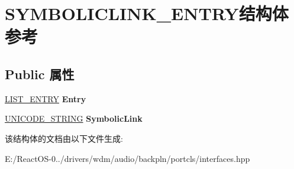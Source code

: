 \hypertarget{struct_s_y_m_b_o_l_i_c_l_i_n_k___e_n_t_r_y}{}\section{S\+Y\+M\+B\+O\+L\+I\+C\+L\+I\+N\+K\+\_\+\+E\+N\+T\+R\+Y结构体 参考}
\label{struct_s_y_m_b_o_l_i_c_l_i_n_k___e_n_t_r_y}
\subsection*{Public 属性}
\begin{DoxyCompactItemize}
\item 
\mbox{\label{struct_s_y_m_b_o_l_i_c_l_i_n_k___e_n_t_r_y_a5a3fbced77b88f52120327fc786aaf0e}} 
\hyperlink{struct___l_i_s_t___e_n_t_r_y}{L\+I\+S\+T\+\_\+\+E\+N\+T\+RY} {\bfseries Entry}
\item 
\mbox{\label{struct_s_y_m_b_o_l_i_c_l_i_n_k___e_n_t_r_y_aef2cd69bee0c6a06906dde2d2ef1979b}} 
\hyperlink{struct___u_n_i_c_o_d_e___s_t_r_i_n_g}{U\+N\+I\+C\+O\+D\+E\+\_\+\+S\+T\+R\+I\+NG} {\bfseries Symbolic\+Link}
\end{DoxyCompactItemize}


该结构体的文档由以下文件生成\+:\begin{DoxyCompactItemize}
\item 
E\+:/\+React\+O\+S-\/0../drivers/wdm/audio/backpln/portcls/interfaces.\+hpp\end{DoxyCompactItemize}
